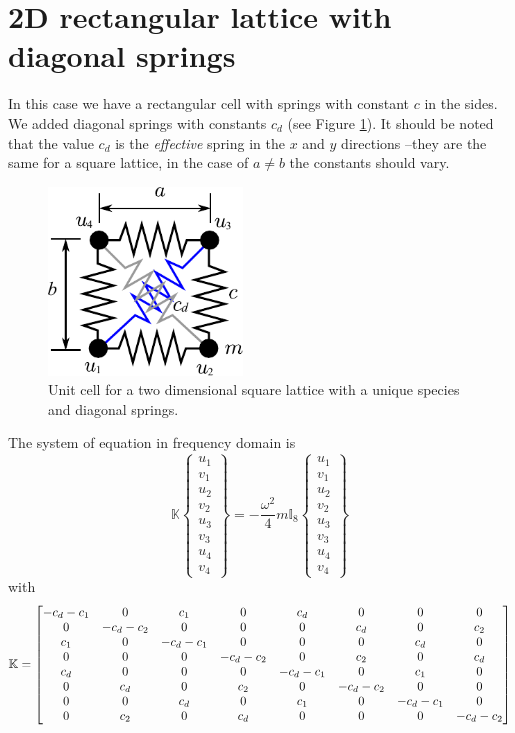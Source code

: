 \documentclass[12pt,letterpaper]{article}
\begin{document}
\section{2D rectangular lattice with diagonal springs}
In this case we have a rectangular cell with springs with constant $c$ in the sides. We added diagonal springs with constants $c_d$ (see Figure \ref{fig:square-diag}). It should be noted that the value $c_d$ is the \emph{effective} spring in the $x$ and $y$ directions --they are the same for a square lattice, in the case of $a\neq b$ the constants should vary.
\begin{figure}[h]
\centering
\includegraphics[height=5cm]{img/spring-square-diag.pdf} 
\caption{Unit cell for a two dimensional square lattice with a unique species and diagonal springs.}\label{fig:square-diag}
\end{figure}

The system of equation in frequency domain is
\begin{equation}
\mathbb{K}
\left\lbrace \begin{array}{c}
u_1 \\ 
v_1 \\ 
u_2 \\ 
v_2 \\ 
u_3 \\ 
v_3 \\ 
u_4 \\ 
v_4
\end{array}  \right\rbrace= -\frac{\omega^2}{4}m \mathbb{I}_8
\left\lbrace \begin{array}{c}
u_1 \\ 
v_1 \\ 
u_2 \\ 
v_2 \\ 
u_3 \\ 
v_3 \\ 
u_4 \\ 
v_4
\end{array} \right\rbrace
\end{equation}
with
\[\mathbb{K} = \begin{bmatrix}
-c_{d}-c_{1} & 0 & c_{1} & 0 & c_{d} & 0 & 0 & 0\cr
0 & -c_{d}-c_{2} & 0 & 0 & 0 & c_{d} & 0 & c_{2}\cr
c_{1} & 0 & -c_{d}-c_{1} & 0 & 0 & 0 & c_{d} & 0\cr
0 & 0 & 0 & -c_{d}-c_{2} & 0 & c_{2} & 0 & c_{d}\cr
c_{d} & 0 & 0 & 0 & -c_{d}-c_{1} & 0 & c_{1} & 0\cr
0 & c_{d} & 0 & c_{2} & 0 & -c_{d}-c_{2} & 0 & 0\cr
0 & 0 & c_{d} & 0 & c_{1} & 0 & -c_{d}-c_{1} & 0\cr
0 & c_{2} & 0 & c_{d} & 0 & 0 & 0 & -c_{d}-c_{2}\end{bmatrix} \]
\end{document}
